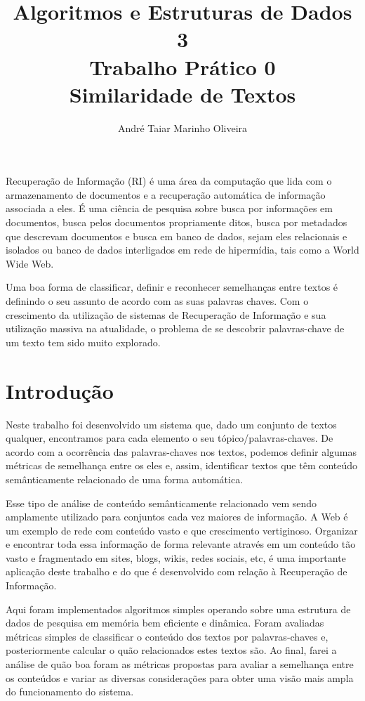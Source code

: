 \documentclass[12pt]{article}
\title{Algoritmos e Estruturas de Dados 3 \\ Trabalho Prático 0 \\
\huge{Similaridade de Textos}}
\author{André Taiar Marinho Oliveira}
\begin{document}
\maketitle

\begin{resumo}
Recuperação de Informação (RI) é uma área da computação  que lida com o armazenamento de documentos 
e a recuperação automática de informação associada a eles. É uma ciência de pesquisa sobre busca 
por informações em documentos, busca pelos documentos propriamente ditos, busca por metadados que 
descrevam documentos e busca em banco de dados, sejam eles relacionais e isolados ou banco de 
dados interligados em rede de hipermídia, tais como a World Wide Web.

Uma boa forma de classificar, definir e reconhecer semelhanças entre textos é definindo o
seu assunto de acordo com as suas palavras chaves. Com o crescimento da
utilização de sistemas de Recuperação de Informação e sua utilização massiva na
atualidade, o problema de se descobrir palavras-chave de um texto tem sido muito
explorado.
\end{resumo}

\section{Introdução}

Neste trabalho foi desenvolvido um sistema que, dado um conjunto de textos
qualquer, encontramos para cada elemento o seu tópico/palavras-chaves. De acordo
com a ocorrência das palavras-chaves nos textos, podemos definir algumas
métricas de semelhança entre os eles e, assim, identificar 
textos que têm conteúdo semânticamente relacionado de uma forma automática.

Esse tipo de análise de conteúdo semânticamente relacionado vem sendo amplamente
utilizado para conjuntos cada vez maiores de informação. A Web é um exemplo de
rede com conteúdo vasto e que crescimento vertiginoso. Organizar e encontrar
toda essa informação de forma relevante através em um conteúdo tão vasto e
fragmentado em sites, blogs, wikis, redes sociais, etc, é uma importante
aplicação deste trabalho e do que é desenvolvido com relação à Recuperação de
Informação.

Aqui foram implementados algoritmos simples operando sobre uma estrutura de
dados de pesquisa em memória bem eficiente e dinâmica. Foram avaliadas métricas
simples de classificar o conteúdo dos textos por palavras-chaves e,
posteriormente calcular o quão relacionados estes textos são. Ao final, farei a
análise de quão boa foram as métricas propostas para avaliar a semelhança entre
os conteúdos e variar as diversas considerações para obter uma visão mais ampla
do funcionamento do sistema.
\end{document}
